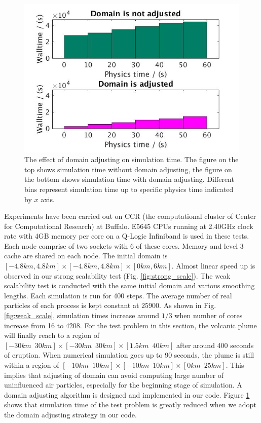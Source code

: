 \documentclass[journal abbreviation, manuscript]{copernicus}
\begin{document}
%
\begin{figure}[!t]
\centering
\includegraphics[scale=0.35]{adj_vs_no}
\caption{The effect of domain adjusting on simulation time. The figure on the top shows simulation time without domain adjusting, the figure on the bottom shows simulation time with domain adjusting. Different bins represent simulation time up to specific physics time indicated by $x$ axis.}
\label{fig:adj_vs_no}
\end{figure}
%
Experiments have been carried out on CCR (the computational cluster of Center for Computational Research) at Buffalo. E5645 CPUs running at 2.40GHz clock rate with 4GB memory per core on a Q-Logic Infiniband is used in these tests. Each node comprise of two sockets with 6 of these cores. Memory and level 3 cache are shared on each node. The initial domain is $[-4.8km,4.8km] \times [-4.8km,4.8km] \times [0km, 6km]$. Almost linear speed up is observed in our strong scalability test (Fig. \ref{fig:strong_scale}).
The weak scalability test is conducted with the same initial domain and various smoothing lengths. Each simulation is run for 400 steps. The average number of real particles of each process is kept constant at $25900$. As shown in Fig. \ref{fig:weak_scale}, simulation times increase around $1/3$ when number of cores increase from 16 to 4208. For the test problem in this section, the volcanic plume will finally reach to a region of $[-30km \,\,\, 30km] \times [-30km\,\,\,30km] \times [1.5km\,\,\,40km]$ after around 400 seconds of eruption. When numerical simulation goes up to 90 seconds, the plume is still within a region of $[-10km\,\,\,10km] \times [-10km\,\,\,10km] \times [0km\,\,\,25km]$. This implies that adjusting of domain can avoid computing large number of uninfluenced air particles, especially for the beginning stage of simulation. A domain adjusting algorithm is designed and implemented in our code. Figure \ref{fig:adj_vs_no} shows that simulation time of the test problem is greatly reduced when we adopt the domain adjusting strategy in our code.
\end{document}
